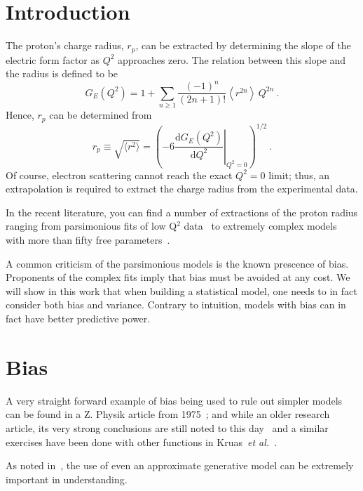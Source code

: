 \documentclass[10pt,aps,prc,twocolumn]{revtex4-1}
\begin{document}
\maketitle

\section{Introduction}

The proton's charge radius, $r_p$, can be extracted
by determining the slope of the electric form factor as $Q^2$
approaches zero.   The relation between this slope and 
the radius is defined to be
$$
G_E(Q^2)
   =  1
   +  \sum_{n\ge 1} \frac{(-1)^n}{(2n+1)!}
      \left\langle r^{2n} \right\rangle \, Q^{2n} \>.
$$
Hence, $r_p$ can be determined from
$$
  r_p \equiv \sqrt{ \langle r^2 \rangle}
   = \left( -6  \left. \frac{\mathrm{d} G_E(Q^2)}{\mathrm{d}Q^2}
    \right|_{Q^{2}=0} \right)^{1/2} \>.
 $$
Of course, electron scattering cannot reach the exact $Q^2 = 0$ limit; thus,
an extrapolation is required to extract the charge radius from the experimental data.

In the recent literature, you can find a number of extractions of the proton radius ranging from
parsimonious fits of low Q$^2$ data~\cite{Griffioen:2015hta,Horbatsch:2016ilr,Higinbotham:2015rja} to extremely 
complex models with more than fifty free parameters~\cite{}.

A common criticism of the parsimonious models is the known prescence of bias. 
Proponents of the complex fits imply that bias must be avoided at any cost. 
We will show in this work that when building a statistical model, one needs to in fact consider both bias and variance.
Contrary to intuition, models with bias can in fact have better predictive power.%

\section{Bias}

A very straight forward example of bias being used to rule out simpler models can be found in a Z. Physik
article from 1975~\cite{Borkowski:1975}; and while an older research article, its very strong conclusions are still 
noted to this day~\cite{Sick:2017aor} and a similar exercises have been done with other functions in Kruas~\textit{et al.}~\cite{Kraus:2014qua}.

As noted in~\cite{Hogg:2010yz}, the use of even an approximate generative model can be extremely important in understanding. 
\end{document}
